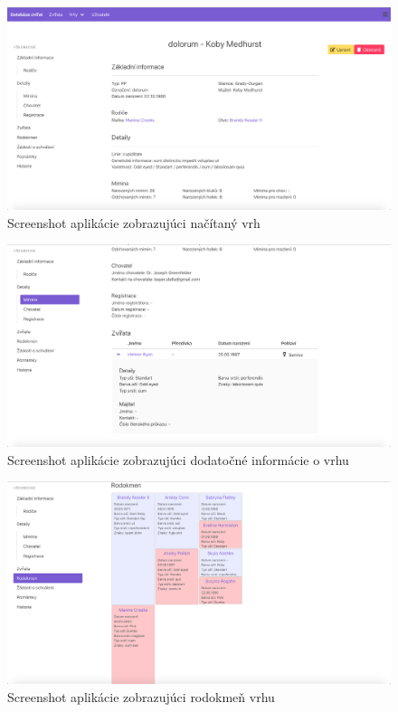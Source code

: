 \begin{figure}[H]
	\includegraphics[width=1.0\textwidth]{media/priloha/vrh/2.png}
	\caption{Screenshot aplikácie zobrazujúci načítaný vrh}
\end{figure}

\vspace*{\fill}

\begin{figure}[H]
	\includegraphics[width=1.0\textwidth]{media/priloha/vrh/3.png}
	\caption{Screenshot aplikácie zobrazujúci dodatočné informácie o vrhu}
\end{figure}

\begin{figure}[H]
	\includegraphics[width=1.0\textwidth]{media/priloha/vrh/4.png}
	\caption{Screenshot aplikácie zobrazujúci rodokmeň vrhu}
\end{figure}

